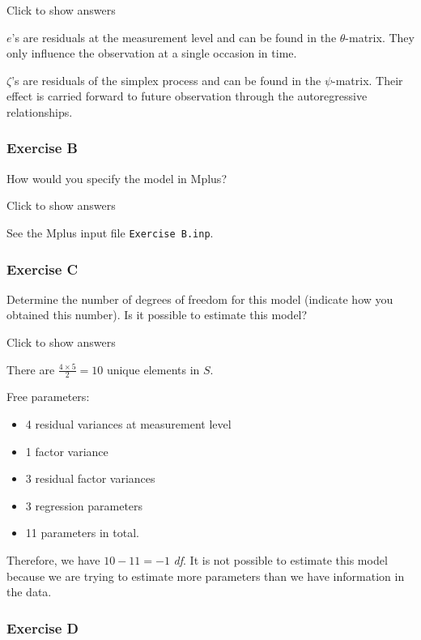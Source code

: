\documentclass[
]{book}
\providecommand{\tightlist}{%
  \setlength{\itemsep}{0pt}\setlength{\parskip}{0pt}}
\begin{document}
Click to show answers

\(e\)'s are residuals at the measurement level and can be found in the \(\theta\)-matrix. They only influence the observation at a single occasion in time.

\(\zeta\)'s are residuals of the simplex process and can be found in the \(\psi\)-matrix. Their effect is carried forward to future observation through the autoregressive relationships.

\hypertarget{exercise-b}{%
\subsubsection*{Exercise B}\label{exercise-b}}

How would you specify the model in Mplus?

Click to show answers

See the Mplus input file \texttt{Exercise\ B.inp}.

\hypertarget{exercise-c}{%
\subsubsection*{Exercise C}\label{exercise-c}}

Determine the number of degrees of freedom for this model (indicate how you obtained this number). Is it possible to estimate this model?

Click to show answers

There are \(\frac{4 \times 5}{2} = 10\) unique elements in \(S\).

Free parameters:

\begin{itemize}
\tightlist
\item
  4 residual variances at measurement level
\item
  1 factor variance
\item
  3 residual factor variances
\item
  3 regression parameters
\item
  11 parameters in total.
\end{itemize}

Therefore, we have \(10 - 11 = -1\) \emph{df}. It is not possible to estimate this model because we are trying to estimate more parameters than we have information in the data.

\hypertarget{exercise-d}{%
\subsubsection*{Exercise D}\label{exercise-d}}
\end{document}

